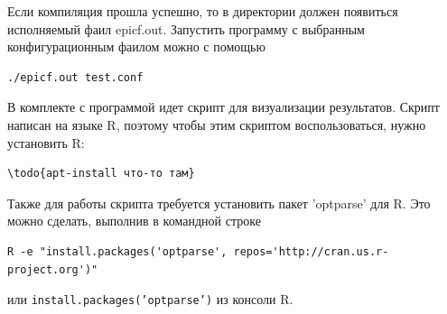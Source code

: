 Если компиляция прошла успешно, то в директории должен появиться исполняемый фаил epicf.out.
Запустить программу с выбранным конфигурационным фаилом можно с помощью 
\begin{verbatim}
./epicf.out test.conf
\end{verbatim}

В комплекте с программой идет скрипт для визуализации результатов.
Скрипт написан на языке R, поэтому чтобы этим скриптом воспользоваться, нужно установить R:
\begin{verbatim}
\todo{apt-install что-то там}
\end{verbatim}
Также для работы скрипта требуется установить пакет 'optparse' для R.
Это можно сделать, выполнив в командной строке
\begin{verbatim}
R -e "install.packages('optparse', repos='http://cran.us.r-project.org')"
\end{verbatim}
или \texttt{install.packages('optparse')} из консоли R.



